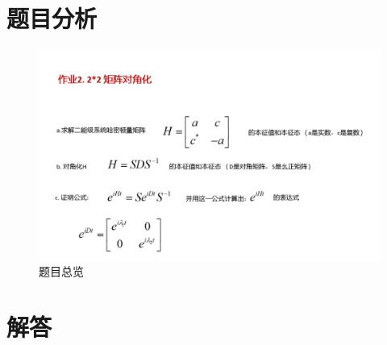 \documentclass[UTF8,a4paper,10pt]{ctexart}
\begin{document}
\section{题目分析}
	\begin{figure}[!htbp]
		\centering
		\includegraphics[width=1\textwidth,height=0.6\textwidth]{pictures/pro2.png}
		\caption{题目总览} \label{project2}
	\end{figure}

\section{解答}




\end{document}
